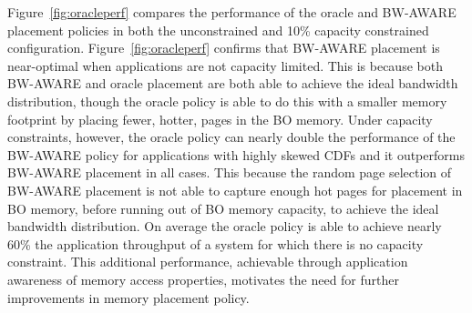{\color{black}Figure~\ref{fig:oracleperf} compares the performance of the oracle and BW-AWARE
placement policies in both the unconstrained and 10\% capacity constrained
configuration.  Figure~\ref{fig:oracleperf} confirms that BW-AWARE placement is
near-optimal when applications are not capacity limited.  This is because both BW-AWARE
and oracle placement are both able to achieve the ideal bandwidth distribution, though
the oracle policy is able to do this with a smaller memory footprint by placing fewer, hotter, pages in the BO memory.
Under capacity constraints, however, the oracle policy can nearly double the performance of the BW-AWARE policy for applications
with highly skewed CDFs and it outperforms BW-AWARE placement in all cases. This because the random
page selection of BW-AWARE placement is not able to capture enough hot pages for placement in BO
memory, before running out of BO memory capacity, to achieve the ideal bandwidth distribution.  
On average the oracle policy is
able to achieve nearly 60\% the application throughput of a system for which there is no capacity
constraint.  This additional performance, achievable through application awareness of memory
access properties, motivates the need for further improvements in memory placement policy.}
